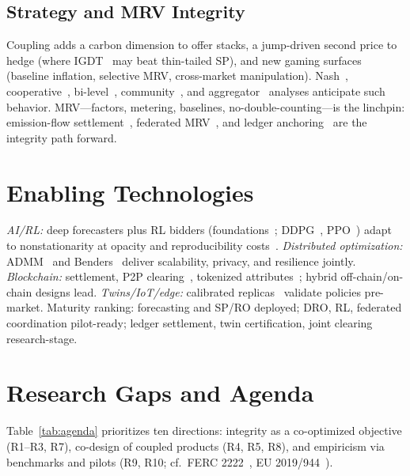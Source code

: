 \documentclass[journal]{IEEEtran}
\begin{document}
\subsection{Strategy and MRV Integrity}
Coupling adds a carbon dimension to offer stacks, a jump-driven second price to hedge (where IGDT~\cite{benhaim2006} may beat thin-tailed SP), and new gaming surfaces (baseline inflation, selective MRV, cross-market manipulation). Nash~\cite{nash1951}, cooperative~\cite{shapley1953}, bi-level~\cite{kardakos2016}, community~\cite{sousa2019}, and aggregator~\cite{gkatzikis2013} analyses anticipate such behavior. MRV---factors, metering, baselines, no-double-counting---is the linchpin: emission-flow settlement~\cite{kang2015}, federated MRV~\cite{mcmahan2017,dwork2006}, and ledger anchoring~\cite{andoni2019} are the integrity path forward.

\section{Enabling Technologies}
\textit{AI/RL:} deep forecasters plus RL bidders (foundations~\cite{sutton2018,mnih2015}; DDPG~\cite{lillicrap2016}, PPO~\cite{schulman2017}) adapt to nonstationarity at opacity and reproducibility costs~\cite{goodfellow2015}. \textit{Distributed optimization:} ADMM~\cite{boyd2011} and Benders~\cite{benders1962} deliver scalability, privacy, and resilience jointly. \textit{Blockchain:} settlement, P2P clearing~\cite{sousa2019}, tokenized attributes~\cite{andoni2019,nakamoto2008}; hybrid off-chain/on-chain designs lead. \textit{Twins/IoT/edge:} calibrated replicas~\cite{tao2019,grieves2014} validate policies pre-market. Maturity ranking: forecasting and SP/RO deployed; DRO, RL, federated coordination pilot-ready; ledger settlement, twin certification, joint clearing research-stage.

\section{Research Gaps and Agenda}
Table~\ref{tab:agenda} prioritizes ten directions: integrity as a co-optimized objective (R1--R3, R7), co-design of coupled products (R4, R5, R8), and empiricism via benchmarks and pilots (R9, R10; cf.\ FERC 2222~\cite{ferc2222}, EU 2019/944~\cite{eudirective2019}).
\end{document}
